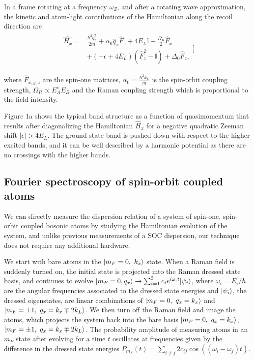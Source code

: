 In a frame rotating at a frequency $\omega_Z$, and after a rotating wave approximation, the kinetic and atom-light contributions of the Hamiltonian along the recoil direction are
\begin{align}
\begin{split}
\hat{H_x} = &\frac{\hbar^2\hat{q}_x^2}{2m} + \alpha_0\hat{q}_x\hat{F}_z +4E_L\mathbb{I} + \frac{\Omega_R}{2}\hat{F}_x\\
& +(-\epsilon+4E_L)(\hat{F}_z^2-\mathbb{I}) +\Delta_0\hat{F}_z, 
\label{Eq:SOCone}
\end{split}]
\end{align}	

 where $\hat{F}_{x,y,z}$ are the spin-one matrices,  $\alpha_0=\frac{\hbar^2k_L}{m}$ is the spin-orbit coupling strength, $\Omega_R\propto E_A^{\star}E_B$ and the Raman coupling strength which is proportional to the field intensity. 
 
Figure 1a shows the typical band structure as a function of quasimomentum that results after diagonalizing the Hamiltonian $\hat{H}_x$ for a negative quadratic Zeeman shift $|\epsilon|>4E_L$. The ground state band is pushed down with respect to the higher excited bands, and it can be well described by a harmonic potential as there are no crossings with the higher bands. 

\subsection{Fourier spectroscopy of spin-orbit coupled atoms}		

 We can directly measure the dispersion relation of a system of spin-one, spin-orbit coupled bosonic atoms by studying the Hamiltonian evolution of the system, and unlike previous measurements of a SOC dispersion, our technique does not require any additional hardware. 

We start with bare atoms in the $|m_F=0,\ k_x\rangle$ state. When a Raman field is suddenly turned on, the initial state is projected into the Raman dressed state basis, and continues to evolve 
$|m_F=0, q_x\rangle\rightarrow \sum_{i=1}^3c_{i}e^{i\omega_it} |\psi_i\rangle$, where $\omega_i=E_i/\hbar$ are the angular frequencies associated to the dressed state energies and $|\psi_i\rangle$, the dressed eigenstates,  are linear combinations of $\ket{m_F=0,\ q_x=k_x}$ and $\ket{m_F=\pm1,\ q_x=k_x\mp2k_L}$. We then turn off the Raman field and image the atoms, which projects the system back into the bare basis $\ket{m_F=0,\ q_x=k_x}$, $\ket{m_F=\pm1,\ q_x=k_x\mp2k_L}$. The probability amplitude of measuring atoms in an $m_F$ state after evolving for a time $t$ oscillates at frequencies given by the difference in the dressed state energies $P_{m_F}(t)=\sum\limits_{i\neq j} 2c_{ij}\cos((\omega_i-\omega_j)t)$.

